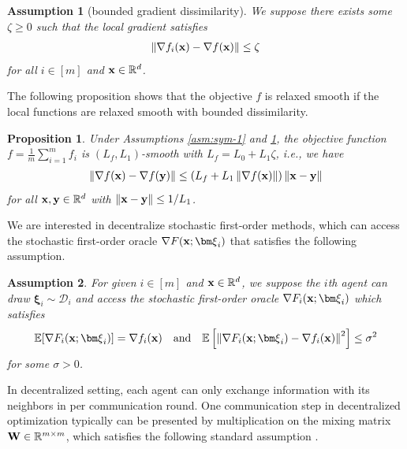 \documentclass[sigconf]{acmart}
\newcommand{\Norm}[1]{\left\| #1 \right\|}
\def\vx{{\bf{x}}}
\def\vy{{\bf{y}}}
\def\fD{{\mathcal{D}}}
\def\BE{{\mathbb{E}}}
\def\BR{{\mathbb{R}}}
\def\mW {{\bf W}}
\theoremstyle{plain}
\newtheorem{asm}{Assumption}
\newtheorem{prop}{Proposition}
\def\vxi{{\bm\xi}}
\begin{document}
\begin{asm}[bounded gradient dissimilarity]\label{asm:heterogeneous}
    We suppose there exists some $\zeta\geq 0$ such that the local gradient satisfies
    \begin{align*}
        \Norm{\nabla f_i(\vx) - \nabla f(\vx)} \leq \zeta
    \end{align*}
    for all $i\in[m]$ and $\vx\in\BR^d$.
\end{asm}

The following proposition shows that the objective $f$ is relaxed smooth if the local functions are relaxed smooth with bounded dissimilarity. 

\begin{prop}\label{prop:global-l0l1}
Under Assumptions \ref{asm:sym-1} and \ref{asm:heterogeneous}, the objective function $f=\frac{1}{m}\sum_{i=1}^m f_i$ is $(L_f,L_1)$-smooth with $L_f=L_0+L_1\zeta$, 
i.e., we have
\begin{align}\label{eq:global-relax-smooth}
    \Norm{\nabla f(\vx)-\nabla f(\vy)} \leq \left(L_f + L_1 \Norm{\nabla f(\vx)}\right)\Norm{\vx-\vy}    
\end{align}
for all $\vx,\vy\in\BR^d$ with $\Norm{\vx-\vy}\leq 1/L_1$.
\end{prop}

We are interested in decentralize stochastic first-order methods, which can access the stochastic first-order oracle $\nabla F(\vx;\vxi_i)$ that satisfies the following assumption.

\begin{asm}\label{asm:sfo}
For given $i\in[m]$ and $\vx\in\BR^d$, we suppose the $i$th agent can draw $\vxi_i\sim\fD_i$ and access the stochastic first-order oracle $\nabla F_i(\vx;\vxi_i)$ which satisfies
\begin{align*}
    \BE[\nabla F_i(\vx;\vxi_i)] = \nabla f_i(\vx)
    \quad\text{and}\quad
    \BE\left[\Norm{\nabla F_i(\vx;\vxi_i) - \nabla f_i(\vx)}^2\right] \leq \sigma^2
\end{align*}
for some $\sigma> 0$.    
\end{asm}


In decentralized setting, each agent can only exchange information with its neighbors in per communication round. 
One communication step in decentralized optimization typically can be presented by multiplication on the mixing matrix~$\mW \in \BR^{m \times m}$, which satisfies the following standard assumption \citep{scaman2017optimal,hendrikx2021optimal,ye2023multi}.
\end{document}
